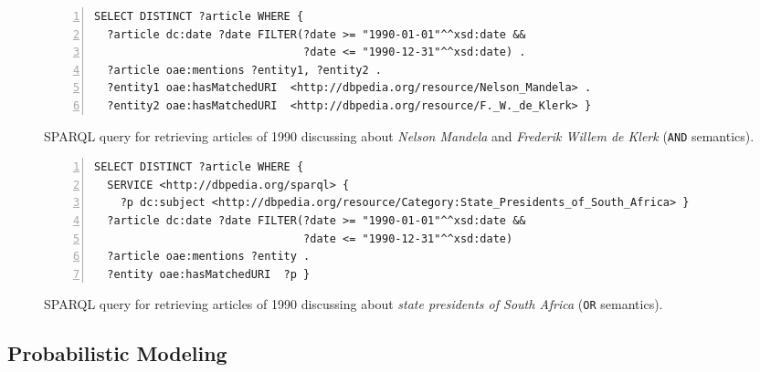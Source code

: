 \begin{figure}[th]
\vspace{-4mm}
\centering \scriptsize
\begin{Verbatim}[frame=lines,numbers=left,numbersep=1pt]
SELECT DISTINCT ?article WHERE {
  ?article dc:date ?date FILTER(?date >= "1990-01-01"^^xsd:date &&
                                ?date <= "1990-12-31"^^xsd:date) .
  ?article oae:mentions ?entity1, ?entity2 .
  ?entity1 oae:hasMatchedURI  <http://dbpedia.org/resource/Nelson_Mandela> .
  ?entity2 oae:hasMatchedURI  <http://dbpedia.org/resource/F._W._de_Klerk> }
\end{Verbatim}
\vspace{-5.5mm}
\caption{SPARQL query for retrieving articles of 1990 discussing
about {\em Nelson Mandela} and {\em Frederik Willem de Klerk} ({\tt AND} semantics).}
\label{fig:modelingExampleQ1}

\centering \scriptsize
\begin{Verbatim}[frame=lines,numbers=left,numbersep=1pt]
SELECT DISTINCT ?article WHERE {
  SERVICE <http://dbpedia.org/sparql> {
    ?p dc:subject <http://dbpedia.org/resource/Category:State_Presidents_of_South_Africa> }
  ?article dc:date ?date FILTER(?date >= "1990-01-01"^^xsd:date &&
                                ?date <= "1990-12-31"^^xsd:date)
  ?article oae:mentions ?entity .
  ?entity oae:hasMatchedURI  ?p }
\end{Verbatim}
\vspace{-5.5mm}
\caption{SPARQL query for retrieving articles of 1990 discussing
about {\em state presidents of South Africa} ({\tt OR} semantics).}
\label{fig:modelingExampleQ2}
\vspace{-4mm}
\end{figure}



\subsection{Probabilistic Modeling}

